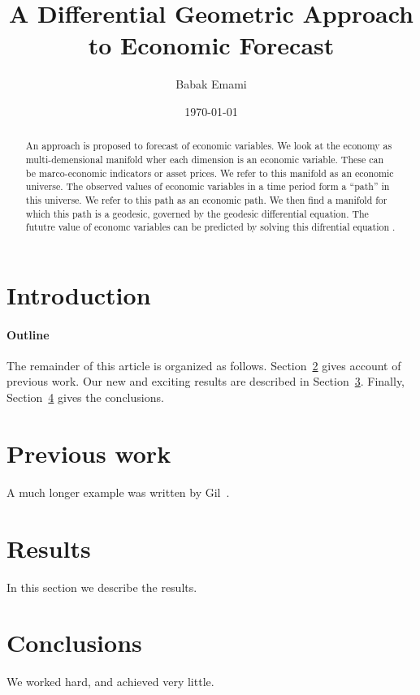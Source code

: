 \documentclass{article}
\title{A Differential Geometric Approach to Economic Forecast}
\author{Babak Emami}
\date{\today}
\begin{document}
\maketitle

\begin{abstract}

An approach is proposed to forecast of economic variables. We look at
the economy as multi-demensional manifold wher each dimension is an
economic variable. These can be marco-economic indicators or asset
prices. We refer to this manifold as an economic universe. The
observed values of economic variables in a time period form a ``path''
in this universe. We refer to this path as an economic path. We then
find a manifold for which this path is a geodesic, governed by the
geodesic differential equation. The fututre value of economc variables can be predicted by
solving this difrential equation
.
\end{abstract}

\section{Introduction}\label{introduction}


\paragraph{Outline}
The remainder of this article is organized as follows.
Section~\ref{previous work} gives account of previous work.
Our new and exciting results are described in Section~\ref{results}.
Finally, Section~\ref{conclusions} gives the conclusions.

\section{Previous work}\label{previous work}
A much longer \LaTeXe{} example was written by Gil~\cite{Gil:02}.

\section{Results}\label{results}
In this section we describe the results.

\section{Conclusions}\label{conclusions}
We worked hard, and achieved very little.



\end{document}
